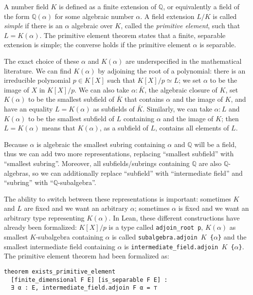 \documentclass{lipics-v2021}
\newcommand{\lean}[1]{\texttt{#1}\xspace} %
\newcommand{\Q}{\mathbb{Q}}
\begin{document}
A number field $K$ is defined as a finite extension of $\Q$, or equivalently a field of the form $\Q(\alpha)$ for some algebraic number $\alpha$.
A field extension $L / K$ is called \emph{simple} if there is an $\alpha$ algebraic over $K$, called the \emph{primitive element}, such that $L = K(\alpha)$.
The primitive element theorem states that a finite, separable extension is simple; the converse holds if the primitive element $\alpha$ is separable.

The exact choice of these $\alpha$ and $K(\alpha)$ are underspecified in the mathematical literature.
We can find $K(\alpha)$ by adjoining the root of a polynomial: there is an irreducible polynomial $p \in K[X]$ such that $K[X] / p \simeq L$; we set $\alpha$ to be the image of $X$ in $K[X] / p$.
We can also take $\alpha : \bar{K}$, the algebraic closure of $K$, set $K(\alpha)$ to be the smallest subfield of $\bar{K}$ that contains $\alpha$ and the image of $K$, and have an equality $L = K(\alpha)$ as subfields of $\bar{K}$.
Similarly, we can take $\alpha : L$ and $K(\alpha)$ to be the smallest subfield of $L$ containing $\alpha$ and the image of $K$; then $L = K(\alpha)$ means that $K(\alpha)$, as a subfield of $L$, contains all elements of $L$.

Because $\alpha$ is algebraic the smallest subring containing $\alpha$ and $\Q$ will be a field, thus we can add two more representations, replacing ``smallest subfield'' with ``smallest subring''.
Moreover, all subfields/subrings containing $\Q$ are also $\Q$-algebras, so we can additionally replace ``subfield'' with ``intermediate field'' and ``subring'' with ``$\Q$-subalgebra''.

The ability to switch between these representations is important: sometimes $K$ and $L$ are fixed and we want an arbitrary $\alpha$; sometimes $\alpha$ is fixed and we want an arbitrary type representing $K(\alpha)$.
In Lean, these different constructions have already been formalized:
$K[X] / p$ is a type called \lean{adjoin\_root p},
$K(\alpha)$ as smallest $K$-subalgebra containing $\alpha$ is called \lean{subalgebra.adjoin $K$ \{$\alpha$\}}
and the smallest intermediate field containing $\alpha$ is \lean{intermediate\-\_field.adjoin $K$ \{$\alpha$\}}.
The primitive element theorem had been formalized as:
\begin{lstlisting}
theorem exists_primitive_element
  [finite_dimensional F E] [is_separable F E] :
  ∃ α : E, intermediate_field.adjoin F α = ⊤
\end{lstlisting}
\end{document}
